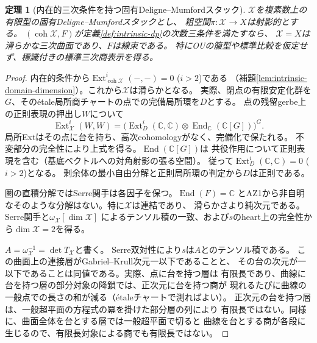 \documentclass[11pt,a4paper]{ltjsarticle}
\newtheorem{theorem}{定理}[section]
\theoremstyle{definition}
\newcommand{\coh}{\operatorname{coh}}
\begin{document}
\begin{theorem}[内在的三次条件を持つ固有Deligne--Mumfordスタック]
\label{thm:ou-effective-orbifold-recognition}
$\mathcal X$を複素数上の有限型の固有Deligne--Mumfordスタックとし、
粗空間$\pi:\mathcal X\to X$は射影的とする。
$(\coh\mathcal X,F)$が定義\ref{def:intrinsic-dp}の次数三条件を満たすなら、
$\mathcal X=X$は滑らかな三次曲面であり、$F$は線束である。
特にOUの箙型や標準比較を仮定せず、標識付きの標準三次商表示を得る。
\end{theorem}
\begin{proof}
内在的条件から$\operatorname{Ext}^{i}_{\coh\mathcal X}(-,-)=0$ ($i>2$)である
（補題\ref{lem:intrinsic-domain-dimension}）。これから$\mathcal X$は滑らかとなる。
実際、閉点の有限安定化群を$G$、そのétale局所商チャートの点での完備局所環を$D$とする。
点の残留gerbe上の正則表現の押出し$W$について
\[
 \operatorname{Ext}^i_{\mathcal X}(W,W)=
 \big(\operatorname{Ext}^i_D(\mathbb C,\mathbb C)
           \otimes\operatorname{End}_{\mathbb C}(\mathbb C[G])\big)^G.
\]
局所Extはその点に台を持ち、高次cohomologyがなく、完備化で保たれる。
不変部分の完全性により上式を得る。$\operatorname{End}(\mathbb C[G])$は
共役作用について正則表現を含む（基底ベクトルへの対角射影の張る空間）。
従って$\operatorname{Ext}^{i}_D(\mathbb C,\mathbb C)=0$ ($i>2$)となる。
剰余体の最小自由分解と正則局所環の判定から$D$は正則である。

圏の直積分解ではSerre関手は各因子を保つ。$\operatorname{End}(F)=\mathbb C$
とAZ1から非自明なそのような分解はない。特に$\mathcal X$は連結であり、
滑らかさより純次元である。Serre関手と$\omega_{\mathcal X}[\dim\mathcal X]$
によるテンソル積の一致、および$s$のheart上の完全性から$\dim\mathcal X=2$を得る。

$A=\omega_{\mathcal X}^{-1}=\det T_{\mathcal X}$と書く。
Serre双対性により$s$は$A$とのテンソル積である。
この曲面上の連接層がGabriel--Krull次元一以下であることと、
その台の次元が一以下であることは同値である。実際、点に台を持つ層は
有限長であり、曲線に台を持つ層の部分対象の降鎖では、正次元に台を持つ商が
現れるたびに曲線の一般点での長さの和が減る（étaleチャートで測ればよい）。
正次元の台を持つ層は、一般超平面の方程式の冪を掛けた部分層の列により
有限長ではない。同様に、曲面全体を台とする層では一般超平面で切ると
曲線を台とする商が各段に生じるので、有限長対象による商でも有限長ではない。


\end{proof}
\end{document}
